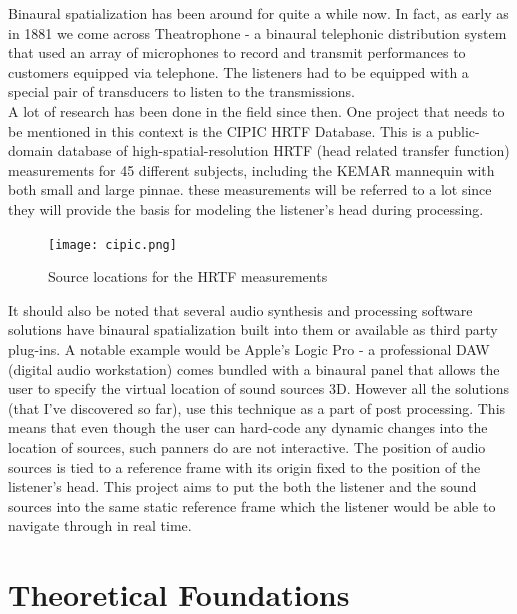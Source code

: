 \documentclass[a4paper,12pt,oneside]{article}
\begin{document}
Binaural spatialization has been around for quite a while now. In fact, as early as in 1881 we come across Theatrophone - a binaural telephonic distribution system that used an array of microphones to record and transmit performances to customers equipped via telephone. The listeners had to be equipped with a special pair of transducers to listen to the transmissions.\\

A lot of research has been done in the field since then. One project that needs to be mentioned in this context is the CIPIC HRTF Database. This is a public-domain database of high-spatial-resolution HRTF (head related transfer function) measurements for 45 different subjects, including the KEMAR mannequin with both small and large pinnae. these measurements will be referred to a lot since they will provide the basis for modeling the listener's head during processing.\cite{cipic1}\\

\begin{center}
\begin{figure}[H]
    \centering
    \texttt{[image: cipic.png]}
    \caption{Source locations for the HRTF measurements}
    \label{fig:hrtf measurement points}
\end{figure}
\end{center}

It should also be noted that several audio synthesis and processing software solutions have binaural spatialization built into them or available as third party plug-ins. A notable example would be Apple's Logic Pro - a professional DAW (digital audio workstation) comes bundled with a binaural panel that allows the user to specify the virtual location of sound sources 3D. However all the solutions (that I've discovered so far), use this technique as a part of post processing. This means that even though the user can hard-code any dynamic changes into the location of sources, such panners do are not interactive. The position of audio sources is tied to a reference frame with its origin fixed to the position of the listener's head. This project aims to put the both the listener and the sound sources into the same static reference frame which the listener would be able to navigate through in real time.\cite{aap1}
  
\section{Theoretical Foundations}
  
\end{document}
